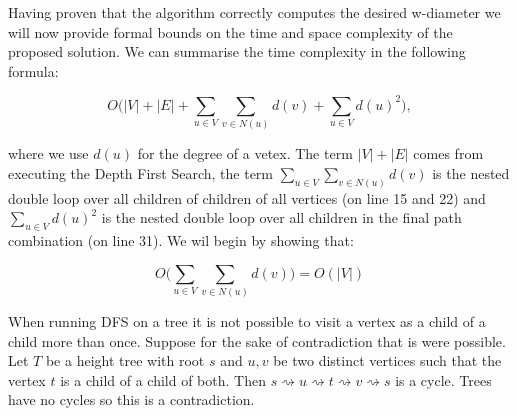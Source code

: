 




Having proven that the algorithm correctly computes the desired w-diameter we will now provide formal bounds on the time and space complexity of the proposed solution. We can summarise the time complexity in the following formula:

$$ O\bigg( |V| + |E| + \sum_{u \in V}{\sum_{v \in N(u)}{d(v)}} + \sum_{u \in V}{d(u)^2}  \bigg) ,$$

where we use $d(u)$ for the degree of a vetex. The term $|V| + |E|$ comes from executing the Depth First Search, the term $\sum_{u \in V}{\sum_{v \in N(u)}{d(v)}}$ is the nested double loop over all children of children of all vertices (on line 15 and 22) and $\sum_{u \in V}{d(u)^2}$ is the nested double loop over all children in the final path combination (on line 31). We wil begin by showing that:

$$ O\bigg( \sum_{u \in V}{\sum_{v \in N(u)}{d(v)}} \bigg) = O(|V|) $$

When running DFS on a tree it is not possible to visit a vertex as a child of a child more than once. Suppose for the sake of contradiction that is were possible. Let $T$ be a height tree with root $s$ and $u, v$ be two distinct vertices such that the vertex $t$ is a child of a child of both. Then $s \rightsquigarrow u \rightsquigarrow t \rightsquigarrow v \rightsquigarrow s$ is a cycle. Trees have no cycles so this is a contradiction.

